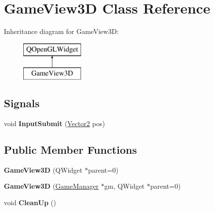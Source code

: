 \hypertarget{classGameView3D}{\section{Game\-View3\-D Class Reference}
\label{classGameView3D}
}
Inheritance diagram for Game\-View3\-D\-:\begin{figure}[H]
\begin{center}
\leavevmode
\includegraphics[height=2.000000cm]{classGameView3D}
\end{center}
\end{figure}
\subsection*{Signals}
\begin{DoxyCompactItemize}
\item 
\hypertarget{classGameView3D_ada434861732fe261a9a7958de4fb5f2e}{void {\bfseries Input\-Submit} (\hyperlink{structVector2}{Vector2} pos)}\label{classGameView3D_ada434861732fe261a9a7958de4fb5f2e}

\end{DoxyCompactItemize}
\subsection*{Public Member Functions}
\begin{DoxyCompactItemize}
\item 
\hypertarget{classGameView3D_aa2a60cd38325c7a4ec92909d2efe7a80}{{\bfseries Game\-View3\-D} (Q\-Widget $\ast$parent=0)}\label{classGameView3D_aa2a60cd38325c7a4ec92909d2efe7a80}

\item 
\hypertarget{classGameView3D_a447292a1846348584fea8cbd2392d1dd}{{\bfseries Game\-View3\-D} (\hyperlink{classGameManager}{Game\-Manager} $\ast$gm, Q\-Widget $\ast$parent=0)}\label{classGameView3D_a447292a1846348584fea8cbd2392d1dd}

\item 
\hypertarget{classGameView3D_a9662a858540b5fcc1a80d78cd0a0aa2a}{void {\bfseries Clean\-Up} ()}\label{classGameView3D_a9662a858540b5fcc1a80d78cd0a0aa2a}

\end{DoxyCompactItemize}
